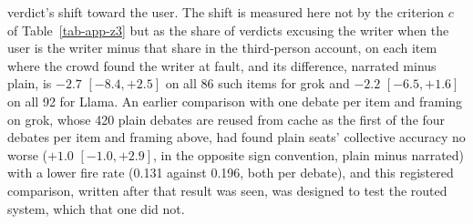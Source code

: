 verdict's shift toward the user. The shift is measured here not by the
criterion $c$ of Table~\ref{tab-app-z3} but as the share of verdicts excusing
the writer when the user is the writer minus that share in the third-person
account, on each item where the crowd found the writer at fault, and its
difference, narrated minus plain, is $-2.7$ $[-8.4, +2.5]$ on all 86 such
items for grok and $-2.2$ $[-6.5, +1.6]$ on all 92 for Llama.
An earlier comparison with one debate per item and framing on grok, whose
420 plain debates are reused from cache as the first of the four debates per
item and framing above, had found plain seats' collective accuracy no worse ($+1.0$
$[-1.0, +2.9]$, in the opposite sign convention, plain minus narrated) with a
lower fire rate (0.131 against
0.196, both per debate), and this registered comparison, written after that
result was seen, was designed to test the routed system, which that one did
not.

